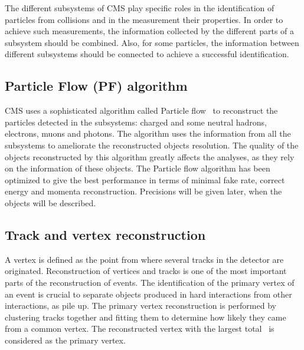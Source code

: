The different subsystems of CMS play specific roles in the identification of particles from collisions and in the measurement their properties. In order to achieve such measurements, the information collected by the different parts of a subsystem should be combined. Also, for some particles, the information between different subsystems should be connected to achieve a successful identification.%

\subsection{Particle Flow (PF) algorithm}

CMS uses a sophisticated algorithm called Particle flow~\cite{CMS:2009nxa,CMS:2010eua,CMS:2010byl,CMS:2010aua} to reconstruct the particles detected in the subsystems: charged and some neutral hadrons, electrons, muons and photons. The algorithm uses the information from all the subsystems to ameliorate the reconstructed objects resolution.%
The quality of the objects reconstructed by this algorithm greatly affects the analyses, as they rely on the information of these objects. The Particle flow algorithm has been optimized to give the best performance in terms of minimal fake rate, correct energy and momenta reconstruction. Precisions will be given later, when the objects will be described.

\subsection{Track and vertex reconstruction}

A vertex is defined as the point from where several tracks in the detector are originated. Reconstruction of vertices and tracks is one of the most important parts of the reconstruction of events. The identification of the primary vertex of an event is crucial to separate objects produced in hard interactions from other interactions, as pile up. The primary vertex reconstruction is performed by clustering tracks together and fitting them to determine how likely they came from a common vertex. The reconstructed vertex with the largest total \pt~is considered as the primary vertex.

